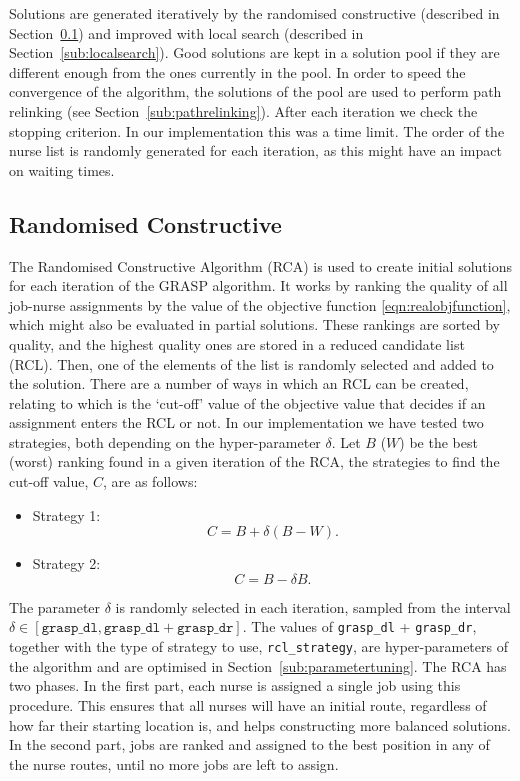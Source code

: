 \documentclass[a4paper,11pt,authoryear]{elsarticle}
\begin{document}
Solutions are generated iteratively by the randomised constructive (described in Section~\ref{sub:randomisedconstructive}) and improved with local search (described in Section~\ref{sub:localsearch}). Good solutions are kept in a solution pool if they are different enough from the ones currently in the pool. In order to speed the convergence of the algorithm, the solutions of the pool are used to perform path relinking (see Section~\ref{sub:pathrelinking}). After each iteration we check the stopping criterion. In our implementation this was a time limit. The order of the nurse list is randomly generated for each iteration, as this might have an impact on waiting times. 

\subsection{Randomised Constructive}
\label{sub:randomisedconstructive}
\noindent The Randomised Constructive Algorithm (RCA) is used to create initial solutions for each iteration of the GRASP algorithm. It works by ranking the quality of all job-nurse assignments by the value of the objective function \eqref{eqn:realobjfunction}, which might also be evaluated in partial solutions. These rankings are sorted by quality, and the highest quality ones are stored in a reduced candidate list (RCL). Then, one of the elements of the list is randomly selected and added to the solution. There are a number of ways in which an RCL can be created, relating to which is the `cut-off' value of the objective value that decides if an assignment enters the RCL or not. In our implementation we have tested two strategies, both depending on the hyper-parameter $\delta$. Let $B$ ($W$) be the best (worst) ranking found in a given iteration of the RCA, the strategies to find the cut-off value, $C$, are as follows:
\begin{itemize}
     \item[1)] Strategy 1:
     \begin{equation}
         C = B + \delta (B - W).
     \end{equation}

     \item[2)] Strategy 2:
     \begin{equation}
         C = B - \delta B.
     \end{equation}
 \end{itemize} 
The parameter $\delta$ is randomly selected in each iteration, sampled from the interval $\delta \in [\texttt{grasp\_dl}, \texttt{grasp\_dl} + \texttt{grasp\_dr}]$.
The values of \texttt{grasp\_dl} + \texttt{grasp\_dr}, together with the type of strategy to use, \texttt{rcl\_strategy}, are hyper-parameters of the algorithm and are optimised in Section~\ref{sub:parametertuning}. The RCA has two phases. In the first part, each nurse is assigned a single job using this procedure. This ensures that all nurses will have an initial route, regardless of how far their starting location is, and helps constructing more balanced solutions. In the second part, jobs are ranked and assigned to the best position in any of the nurse routes, until no more jobs are left to assign. 
\end{document}
